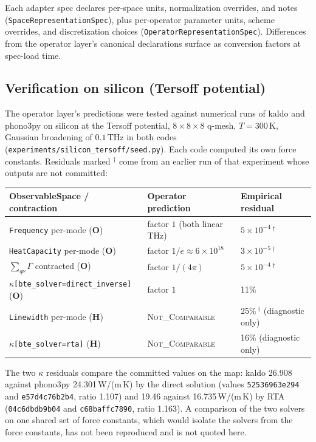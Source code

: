 \documentclass[11pt,a4paper]{article}
\begin{document}
Each adapter spec declares per-space units, normalization overrides, and notes
(\texttt{SpaceRepresentationSpec}), plus per-operator parameter units, scheme
overrides, and discretization choices (\texttt{OperatorRepresentationSpec}). Differences
from the operator layer's canonical declarations surface as conversion factors at
spec-load time.

\subsection{Verification on silicon (Tersoff potential)}
\label{ssec:silicon-verification}

The operator layer's predictions were tested against numerical runs of kaldo and
phono3py on silicon at the Tersoff potential, $8\times 8\times 8$ q-mesh,
$T = 300\,\text{K}$, Gaussian broadening of $0.1\,\text{THz}$ in both codes
(\texttt{experiments/silicon\_tersoff/seed.py}). Each code computed its own force
constants. Residuals marked $^\dagger$ come from an earlier run of that experiment
whose outputs are not committed:

\begin{center}
\begin{tabular}{lll}
\toprule
ObservableSpace / contraction & Operator prediction & Empirical residual \\
\midrule
\texttt{Frequency} per-mode (\textbf{O})            & factor $1$ (both linear THz)  & $5\times 10^{-4}$\,$^\dagger$ \\
\texttt{HeatCapacity} per-mode (\textbf{O})         & factor $1/e \approx 6\times 10^{18}$ & $3\times 10^{-5}$\,$^\dagger$ \\
$\sum_{q\nu}\Gamma$ contracted (\textbf{O})          & factor $1/(4\pi)$              & $5\times 10^{-4}$\,$^\dagger$ \\
$\kappa$\texttt{[bte\_solver=direct\_inverse]} (\textbf{O}) & factor $1$                & 11\% \\
\midrule
\texttt{Linewidth} per-mode (\textbf{H})            & \textsc{Not\_Comparable} & 25\%\,$^\dagger$ (diagnostic only) \\
$\kappa$\texttt{[bte\_solver=rta]} (\textbf{H})     & \textsc{Not\_Comparable} & 16\% (diagnostic only) \\
\bottomrule
\end{tabular}
\end{center}
The two $\kappa$ residuals compare the committed values on the map: kaldo 26.908
against phono3py 24.301\,W/(m\,K) by the direct solution (values
\texttt{52536963e294} and \texttt{e57d4c76b2b4}, ratio 1.107) and 19.46 against
16.735\,W/(m\,K) by RTA (\texttt{04c6dbdb9b04} and \texttt{c68baffc7890}, ratio
1.163). A comparison of the two solvers on one shared set of force constants,
which would isolate the solvers from the force constants, has not been
reproduced and is not quoted here.
\end{document}
